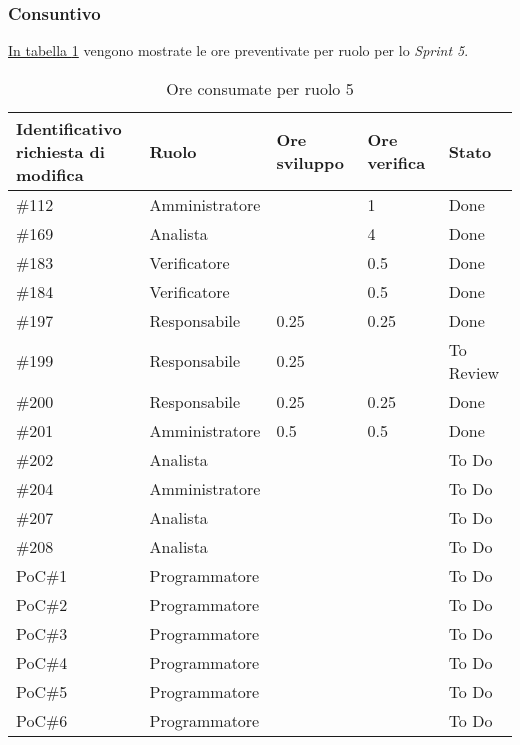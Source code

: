 \subsubsection{Consuntivo}
\label{sec:sprint5_consuntivo}
\hyperref[tab:sprint5_ore_consumate]{In tabella \ref{tab:sprint5_ore_consumate}} vengono mostrate le ore preventivate per ruolo per lo \textit{Sprint 5}.

\begin{table}[H]
    \centering
    \begin{tabular}{| l | l | l | l | l |}
        \hline
            \makecell{\textbf{Identificativo} \\ \textbf{richiesta di modifica}} &
            \textbf{Ruolo} & 
            \textbf{Ore sviluppo} &
            \textbf{Ore verifica} & 
            \textbf{Stato}\\ 
        \hline        
        \#112 & Amministratore &  & 1 & Done\\
        \hline        
        \#169 & Analista &  & 4 & Done\\
        \hline        
        \#183 & Verificatore &  & 0.5 & Done\\
        \hline        
        \#184 & Verificatore &  & 0.5 & Done\\
        \hline        
        \#197 & Responsabile & 0.25 & 0.25 & Done\\
        \hline
        \#199 & Responsabile & 0.25 & & To Review\\
        \hline
        \#200 & Responsabile & 0.25 & 0.25 & Done\\
        \hline
        \#201 & Amministratore & 0.5 & 0.5 & Done\\
        \hline
        \#202 & Analista &  &  & To Do\\
        \hline
        \#204 & Amministratore & & & To Do\\
        \hline
        \#207 & Analista &  &  & To Do\\
        \hline
        \#208 & Analista &  &  & To Do\\
        \hline
        PoC\#1 & Programmatore & & & To Do\\
        \hline
        PoC\#2 & Programmatore & & & To Do\\
        \hline
        PoC\#3 & Programmatore & & & To Do\\
        \hline
        PoC\#4 & Programmatore & & & To Do\\
        \hline
        PoC\#5 & Programmatore & & & To Do\\
        \hline
        PoC\#6 & Programmatore & & & To Do\\
        \hline
    \end{tabular}
    \caption{Ore consumate per ruolo  5}
    \label{tab:sprint5_ore_consumate} 
\end{table}